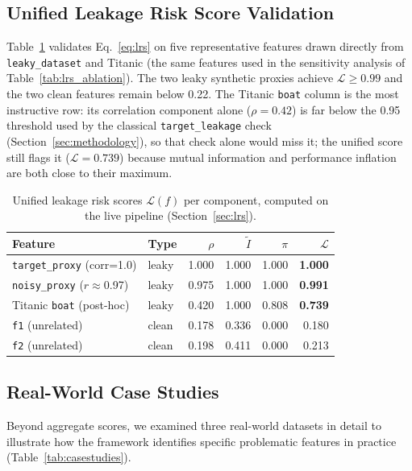 \documentclass[11pt]{article}
\begin{document}
\subsection{Unified Leakage Risk Score Validation}

Table~\ref{tab:lrs} validates Eq.~\eqref{eq:lrs} on five representative
features drawn directly from \texttt{leaky\_dataset} and Titanic (the same
features used in the sensitivity analysis of
Table~\ref{tab:lrs_ablation}).  The two leaky synthetic proxies achieve
$\mathcal{L}\ge0.99$ and the two clean features remain below 0.22.  The
Titanic \texttt{boat} column is the most instructive row: its correlation
component alone ($\rho{=}0.42$) is far below the 0.95 threshold used by the
classical \texttt{target\_leakage} check (Section~\ref{sec:methodology}), so
that check alone would miss it; the unified score still flags it
($\mathcal{L}{=}0.739$) because mutual information and performance
inflation are both close to their maximum.

\begin{table}[!h]
\centering
\caption{Unified leakage risk scores $\mathcal{L}(f)$ per component, computed
  on the live pipeline (Section~\ref{sec:lrs}).}
\label{tab:lrs}
\scriptsize
\begin{tabular}{llrrrr}
\toprule
\textbf{Feature} & \textbf{Type} & $\rho$ & $\widetilde{I}$ & $\pi$ & $\mathcal{L}$ \\
\midrule
\texttt{target\_proxy} (corr=1.0)   & leaky  & 1.000 & 1.000 & 1.000 & \textbf{1.000} \\
\texttt{noisy\_proxy} ($r{\approx}$0.97) & leaky  & 0.975 & 1.000 & 1.000 & \textbf{0.991} \\
Titanic \texttt{boat} (post-hoc)    & leaky  & 0.420 & 1.000 & 0.808 & \textbf{0.739} \\
\texttt{f1} (unrelated)             & clean  & 0.178 & 0.336 & 0.000 & 0.180 \\
\texttt{f2} (unrelated)             & clean  & 0.198 & 0.411 & 0.000 & 0.213 \\
\bottomrule
\end{tabular}
\end{table}

\subsection{Real-World Case Studies}
\label{sec:casestudies}

Beyond aggregate scores, we examined three real-world datasets in detail to
illustrate how the framework identifies specific problematic features in
practice (Table~\ref{tab:casestudies}).
\end{document}
